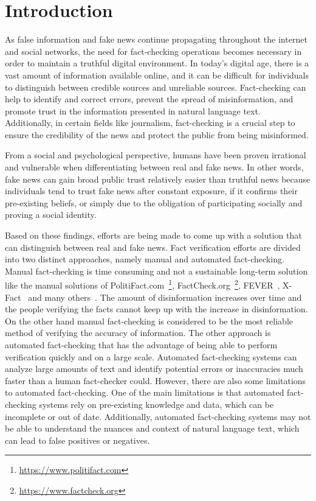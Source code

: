 \chapter{Introduction}
As false information and fake news continue propagating throughout the internet and social networks, the need for fact-checking operations becomes necessary in order to maintain a truthful digital environment. In today's digital age, there is a vast amount of information available online, and it can be difficult for individuals to distinguish between credible sources and unreliable sources. Fact-checking can help to identify and correct errors, prevent the spread of misinformation, and promote trust in the information presented in natural language text. Additionally, in certain fields like journalism, fact-checking is a crucial step to ensure the credibility of the news and protect the public from being misinformed.

From a social and psychological perspective, humans have been proven irrational~\cite{misinformation} and vulnerable when differentiating between real and fake news. In other words, fake news can gain broad public trust relatively easier than truthful news because individuals tend to trust fake news after constant exposure, if it confirms their pre-existing beliefs, or simply due to the obligation of participating socially and proving a social identity.

Based on these findings, efforts are being made to come up with a solution that can distinguish between real and fake news. Fact verification efforts are divided into two distinct approaches, namely manual and automated fact-checking. Manual fact-checking is time consuming and not a sustainable long-term solution like the manual solutions of PolitiFact.com~\footnote{\url{https://www.politifact.com}}, FactCheck.org~\footnote{\url{https://www.factcheck.org}}, FEVER~\cite{fever}, X-Fact~\cite{x-fact} and many others~\cite{fakenewsnet}\cite{liar}\cite{covert}. The amount of disinformation increases over time and the people verifying the facts cannot keep up with the increase in disinformation. On the other hand manual fact-checking is considered to be the most reliable method of verifying the accuracy of information. The other approach is automated fact-checking that has the advantage of being able to perform verification quickly and on a large scale. Automated fact-checking systems can analyze large amounts of text and identify potential errors or inaccuracies much faster than a human fact-checker could. However, there are also some limitations to automated fact-checking. One of the main limitations is that automated fact-checking systems rely on pre-existing knowledge and data, which can be incomplete or out of date. Additionally, automated fact-checking systems may not be able to understand the nuances and context of natural language text, which can lead to false positives or negatives. 

